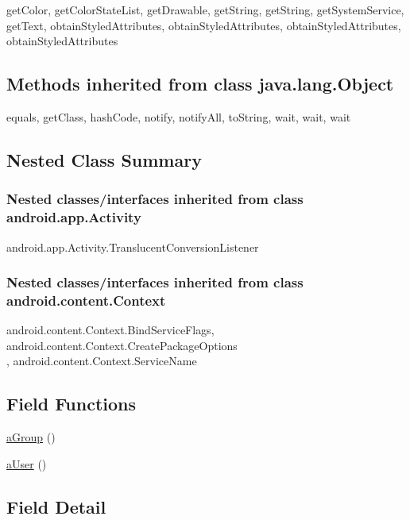 getColor, getColorStateList, getDrawable, getString, getString, getSystemService, getText, obtainStyledAttributes, obtainStyledAttributes, obtainStyledAttributes, obtainStyledAttributes\\

\subsection{Methods inherited from class java.lang.Object}

equals, getClass, hashCode, notify, notifyAll, toString, wait, wait, wait\\


\subsection{Nested Class Summary}
\subsubsection{Nested classes/interfaces inherited from class android.app.Activity}

android.app.Activity.TranslucentConversionListener\\

\subsubsection{Nested classes/interfaces inherited from class android.content.Context}

android.content.Context.BindServiceFlags, android.content.Context.CreatePackageOptions\\, android.content.Context.ServiceName\\



\subsection*{Field Functions}
\begin{DoxyCompactItemize}
\item 
\hyperlink{class_CrowdControlApplication.Android.aGroup}{aGroup} ()
\item 
\hyperlink{class_CrowdControlApplication.Android.aUser}{aUser} ()
\end{DoxyCompactItemize}
\subsection{Field Detail}

